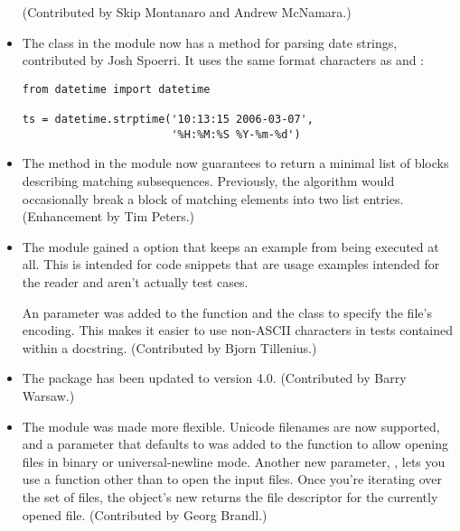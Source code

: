 \documentclass{howto}
\begin{document}
\begin{itemize}
(Contributed by Skip Montanaro and Andrew McNamara.)

\item The  class in the  
module now has a  
method for parsing date strings, contributed by Josh Spoerri.
It uses the same format characters as  and
:

\begin{verbatim}
from datetime import datetime

ts = datetime.strptime('10:13:15 2006-03-07',
                       '%H:%M:%S %Y-%m-%d')
\end{verbatim}

\item The  method
in the  module now guarantees to return a minimal list
of blocks describing matching subsequences.  Previously, the algorithm would
occasionally break a block of matching elements into two list entries.
(Enhancement by Tim Peters.)

\item The  module gained a  option that
keeps an example from being executed at all.  This is intended for
code snippets that are usage examples intended for the reader and
aren't actually test cases.

An  parameter was added to the 
function and the  class to specify the file's
encoding.  This makes it easier to use non-ASCII characters in 
tests contained within a docstring.  (Contributed by Bjorn Tillenius.)

\item The  package has been updated to version 4.0.
(Contributed by Barry Warsaw.)

\item The  module was made more flexible.
Unicode filenames are now supported, and a  parameter that
defaults to  was added to the
 function to allow opening files in binary or
universal-newline mode.  Another new parameter, ,
lets you use a function other than  
to open the input files.  Once you're iterating over 
the set of files, the  object's new
 returns the file descriptor for the currently opened file.
(Contributed by Georg Brandl.)


\end{itemize}
\end{document}

